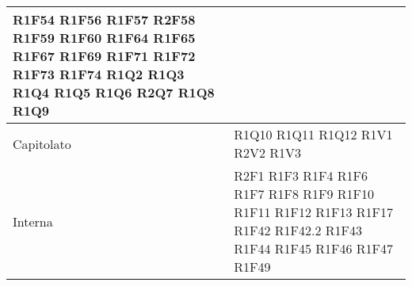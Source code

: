 \begin{center}
\begin{longtable}{|p{44mm}|p{22mm}|}
R1F54 \newline
R1F56 \newline
R1F57 \newline
R2F58 \newline
R1F59 \newline
R1F60 \newline
R1F64 \newline
R1F65 \newline
R1F67 \newline
R1F69 \newline
R1F71 \newline
R1F72 \newline
R1F73 \newline
R1F74 \newline
R1Q2 \newline
R1Q3 \newline
R1Q4 \newline
R1Q5 \newline
R1Q6 \newline
R2Q7 \newline
R1Q8 \newline
R1Q9
\\
\hline
Capitolato &R1Q10 \newline
R1Q11 \newline
R1Q12 \newline
R1V1 \newline
R2V2 \newline
R1V3 
\\
\hline
Interna &
R2F1 \newline
R1F3 \newline
R1F4 \newline
R1F6 \newline
R1F7 \newline
R1F8 \newline
R1F9 \newline
R1F10 \newline
R1F11 \newline
R1F12 \newline
R1F13 \newline
R1F17 \newline
R1F42 \newline
R1F42.2 \newline
R1F43 \newline
R1F44 \newline
R1F45 \newline
R1F46 \newline
R1F47 \newline
R1F49 \newline

\end{longtable}
\end{center}
